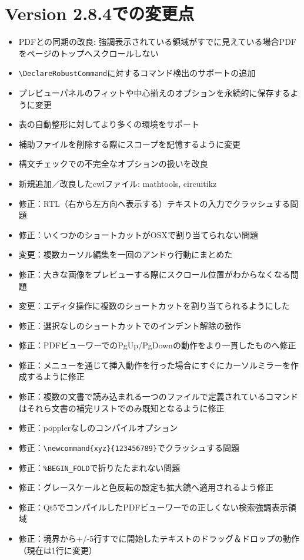 \section{Version 2.8.4での変更点}

\begin{itemize}
\item
  PDFとの同期の改良:
  強調表示されている領域がすでに見えている場合PDFをページのトップへスクロールしない
\item
  \verb+\DeclareRobustCommand+に対するコマンド検出のサポートの追加
\item
  プレビューパネルのフィットや中心揃えのオプションを永続的に保存するように変更
\item
  表の自動整形に対してより多くの環境をサポート
\item
  補助ファイルを削除する際にスコープを記憶するように変更
\item
  構文チェックでの不完全なオプションの扱いを改良
\item
  新規追加／改良したcwlファイル: mathtools, circuitikz
\item
  修正：RTL（右から左方向へ表示する）テキストの入力でクラッシュする問題
\item
  修正：いくつかのショートカットがOSXで割り当てられない問題
\item
  変更：複数カーソル編集を一回のアンドゥ行動にまとめた
\item
  修正：大きな画像をプレビューする際にスクロール位置がわからなくなる問題
\item
  変更：エディタ操作に複数のショートカットを割り当てられるようにした
\item
  修正：選択なしのショートカットでのインデント解除の動作
\item
  修正：PDFビューワーでのPgUp/PgDownの動作をより一貫したものへ修正
\item
  修正：メニューを通じて挿入動作を行った場合にすぐにカーソルミラーを作成するように修正
\item
  修正：複数の文書で読み込まれる一つのファイルで定義されているコマンドはそれら文書の補完リストでのみ既知となるように修正
\item
  修正：popplerなしのコンパイルオプション
\item
  修正：\verb+\newcommand{xyz}{123456789}+でクラッシュする問題
\item
  修正：\verb+%BEGIN_FOLD+で折りたたまれない問題
\item
  修正：グレースケールと色反転の設定も拡大鏡へ適用されるよう修正
\item
  修正：Qt5でコンパイルしたPDFビューワーでの正しくない検索強調表示領域
\item
  修正：境界から+/-5行すでに開始したテキストのドラッグ＆ドロップの動作（現在は1行に変更）
\end{itemize}

